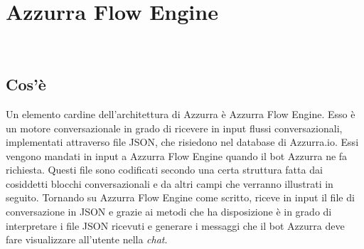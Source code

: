 
\chapter{Azzurra Flow Engine}
\label{cap:flow engine}
\\


\section{Cos'è}
Un elemento cardine dell'architettura di Azzurra è Azzurra Flow Engine. Esso è un motore conversazionale in grado di ricevere in input flussi conversazionali, implementati attraverso file JSON, che risiedono nel database di Azzurra.io. Essi vengono mandati in input a Azzurra Flow Engine quando il bot Azzurra ne fa richiesta. Questi file sono codificati secondo una certa struttura fatta dai cosiddetti blocchi conversazionali e da altri campi che verranno illustrati in seguito. Tornando su Azzurra Flow Engine come scritto, riceve in input il file di conversazione in JSON e grazie ai metodi che ha disposizione è in grado di interpretare i file JSON ricevuti e generare i messaggi che il bot Azzurra deve fare visualizzare all'utente nella \emph{chat}.

